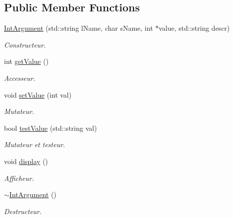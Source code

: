 \subsection*{Public Member Functions}
\begin{DoxyCompactItemize}
\item 
\hyperlink{classIntArgument_a1ff15a0652a7ed6ef37d8438cac02260}{Int\-Argument} (std\-::string l\-Name, char s\-Name, int $\ast$value, std\-::string descr)
\begin{DoxyCompactList}\small\item\em Constructeur. \end{DoxyCompactList}\item 
int \hyperlink{classIntArgument_af58d4470cb44ed7f383c2cba9ba033e5}{get\-Value} ()
\begin{DoxyCompactList}\small\item\em Accesseur. \end{DoxyCompactList}\item 
void \hyperlink{classIntArgument_ab3a07e2d49a5fba9e79fb0d7585f6a85}{set\-Value} (int val)
\begin{DoxyCompactList}\small\item\em Mutateur. \end{DoxyCompactList}\item 
bool \hyperlink{classIntArgument_a3d27054173466542694fd971b13be8bb}{test\-Value} (std\-::string val)
\begin{DoxyCompactList}\small\item\em Mutateur et testeur. \end{DoxyCompactList}\item 
void \hyperlink{classIntArgument_a8bb885657c1f58c1fbacfc513571ea30}{display} ()
\begin{DoxyCompactList}\small\item\em Afficheur. \end{DoxyCompactList}\item 
\hyperlink{classIntArgument_a700cda557bc17999ef952250f2ba39c6}{$\sim$\-Int\-Argument} ()
\begin{DoxyCompactList}\small\item\em Destructeur. \end{DoxyCompactList}\end{DoxyCompactItemize}


